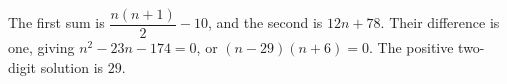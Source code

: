 The first sum is $\dfrac{n(n+1)}{2}-10$, and the second is $12n+78$. Their difference is one, giving $n^2-23n-174=0$, or $(n-29)(n+6)=0$. The positive two-digit solution is $\boxed{29}$.
